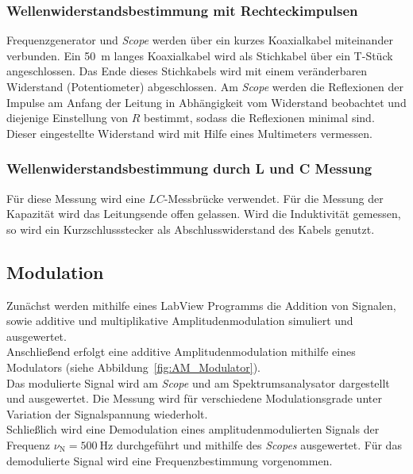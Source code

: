 \documentclass[a4paper,twoside,final]{article}
\begin{document}
\subsubsection{Wellenwiderstandsbestimmung mit Rechteckimpulsen}\label{subsec:BestimmungZL}
Frequenzgenerator und \textit{Scope} werden über ein kurzes Koaxialkabel miteinander verbunden. Ein \SI{50}{\metre} langes Koaxialkabel wird als Stichkabel über ein T-Stück angeschlossen. Das Ende dieses Stichkabels wird mit einem veränderbaren Widerstand (Potentiometer) abgeschlossen. Am \textit{Scope} werden die Reflexionen der Impulse am Anfang der Leitung in Abhängigkeit vom Widerstand beobachtet und diejenige Einstellung von $R$ bestimmt, sodass die Reflexionen minimal sind. Dieser eingestellte Widerstand wird mit Hilfe eines Multimeters vermessen.

\subsubsection{Wellenwiderstandsbestimmung durch L und C Messung}
Für diese Messung wird eine $LC$-Messbrücke verwendet. Für die Messung der Kapazität wird das Leitungsende offen gelassen. Wird die Induktivität gemessen, so wird ein Kurzschlussstecker als Abschlusswiderstand des Kabels genutzt.

\subsection{Modulation}
Zunächst werden mithilfe eines LabView Programms die Addition von Signalen, sowie additive und multiplikative Amplitudenmodulation simuliert und ausgewertet.\\
Anschließend erfolgt eine additive Amplitudenmodulation mithilfe eines Modulators (siehe Abbildung~\ref{fig:AM_Modulator}).\\
Das modulierte Signal wird am \textit{Scope} und am Spektrumsanalysator dargestellt und ausgewertet. Die Messung wird für verschiedene Modulationsgrade unter Variation der Signalspannung wiederholt.\\
Schließlich wird eine Demodulation eines amplitudenmodulierten Signals der Frequenz $\nu_\text{N} = \SI{500}{\hertz}$ durchgeführt und mithilfe des \textit{Scopes} ausgewertet. Für das demodulierte Signal wird eine Frequenzbestimmung vorgenommen.
\end{document}

